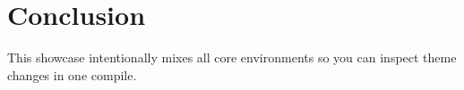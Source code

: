 \documentclass[../main.tex]{subfiles}
\begin{document}
\section{Conclusion}

This showcase intentionally mixes all core environments so you can inspect theme changes in one compile.

\printbibliography
\end{document}
